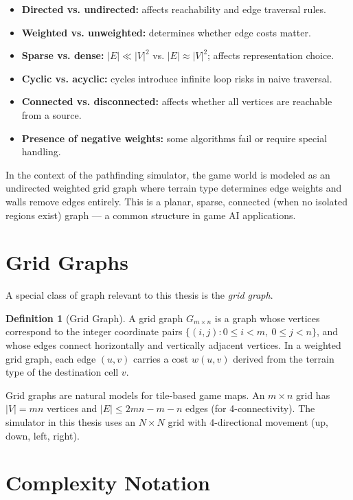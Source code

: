 \documentclass[12pt, a4paper, oneside]{report}
\theoremstyle{definition}
\newtheorem{definition}{Definition}[chapter]
\begin{document}
\begin{itemize}
    \item \textbf{Directed vs. undirected:} affects reachability and edge traversal rules.
    \item \textbf{Weighted vs. unweighted:} determines whether edge costs matter.
    \item \textbf{Sparse vs. dense:} $|E| \ll |V|^2$ vs. $|E| \approx |V|^2$; affects representation choice.
    \item \textbf{Cyclic vs. acyclic:} cycles introduce infinite loop risks in naive traversal.
    \item \textbf{Connected vs. disconnected:} affects whether all vertices are reachable from a source.
    \item \textbf{Presence of negative weights:} some algorithms fail or require special handling.
\end{itemize}

In the context of the pathfinding simulator, the game world is modeled as an undirected weighted grid graph where terrain type determines edge weights and walls remove edges entirely. This is a planar, sparse, connected (when no isolated regions exist) graph — a common structure in game AI applications.

\section{Grid Graphs}

A special class of graph relevant to this thesis is the \emph{grid graph}.

\begin{definition}[Grid Graph]
A grid graph $G_{m \times n}$ is a graph whose vertices correspond to the integer coordinate pairs $\{(i,j) : 0 \leq i < m,\ 0 \leq j < n\}$, and whose edges connect horizontally and vertically adjacent vertices. In a weighted grid graph, each edge $(u,v)$ carries a cost $w(u,v)$ derived from the terrain type of the destination cell $v$.
\end{definition}

Grid graphs are natural models for tile-based game maps. An $m \times n$ grid has $|V| = mn$ vertices and $|E| \leq 2mn - m - n$ edges (for 4-connectivity). The simulator in this thesis uses an $N \times N$ grid with 4-directional movement (up, down, left, right).

\section{Complexity Notation}
\end{document}
